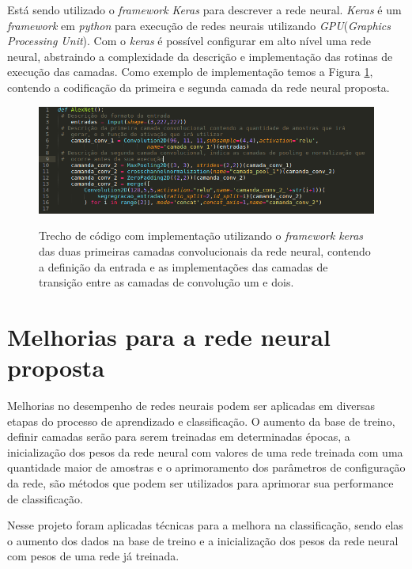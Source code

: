\par Está sendo utilizado o \textit{framework} \textit{Keras} \cite{chollet2015keras} para descrever a rede neural. \textit{Keras} é um \textit{framework} em \textit{python} para execução de redes neurais utilizando \textit{GPU}(\textit{Graphics Processing Unit}). Com o \textit{keras} é possível configurar em alto nível uma rede neural, abstraindo a complexidade da descrição e implementação das rotinas de execução das camadas. Como exemplo de implementação temos a Figura \ref{fig:conv_keras}, contendo a codificação da primeira e segunda camada da rede neural proposta.

\begin{figure}[H]
  \centering
  \caption{Trecho de código com implementação utilizando o \textit{framework} \textit{keras} das duas primeiras camadas convolucionais da rede neural, contendo a definição da entrada e as implementações das camadas de transição entre as camadas de convolução um e dois.}
  \includegraphics[width=400pt]{dados/figuras/exemplo_keras}
  \label{fig:conv_keras}
\end{figure}


\section{Melhorias para a rede neural proposta}

Melhorias no desempenho de redes neurais podem ser aplicadas em diversas etapas do processo de aprendizado e classificação. O aumento da base de treino, definir camadas serão para serem treinadas em determinadas épocas, a inicialização dos pesos da rede neural com valores de uma rede treinada com uma quantidade maior de amostras e o aprimoramento dos parâmetros de configuração da rede, são métodos que podem ser utilizados para aprimorar sua performance de classificação.

\par Nesse projeto foram aplicadas técnicas para a melhora na classificação, sendo elas
o aumento dos dados na base de treino e a inicialização dos pesos da rede neural com pesos de uma rede já treinada. %

